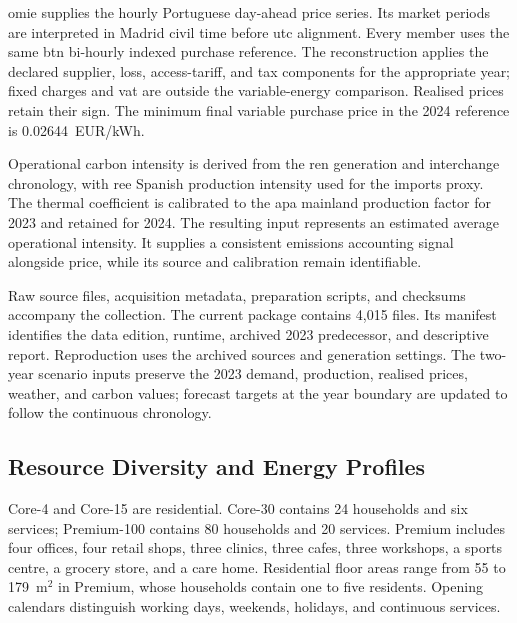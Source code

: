 \gls{omie} supplies the hourly Portuguese day-ahead price series. Its market periods are interpreted in Madrid civil time before \gls{utc} alignment. Every member uses the same \gls{btn} bi-hourly indexed purchase reference. The reconstruction applies the declared supplier, loss, access-tariff, and tax components for the appropriate year; fixed charges and \gls{vat} are outside the variable-energy comparison. Realised prices retain their sign. The minimum final variable purchase price in the 2024 reference is 0.02644~EUR/kWh.

Operational carbon intensity is derived from the \gls{ren} generation and interchange chronology, with \gls{ree} Spanish production intensity used for the imports proxy. The thermal coefficient is calibrated to the \gls{apa} mainland production factor for 2023 and retained for 2024. The resulting input represents an estimated average operational intensity. It supplies a consistent emissions accounting signal alongside price, while its source and calibration remain identifiable.

Raw source files, acquisition metadata, preparation scripts, and checksums accompany the collection. The current package contains 4,015 files. Its manifest identifies the data edition, runtime, archived 2023 predecessor, and descriptive report. Reproduction uses the archived sources and generation settings. The two-year scenario inputs preserve the 2023 demand, production, realised prices, weather, and carbon values; forecast targets at the year boundary are updated to follow the continuous chronology.

\subsection{Resource Diversity and Energy Profiles}

Core-4 and Core-15 are residential. Core-30 contains 24 households and six services; Premium-100 contains 80 households and 20 services. Premium includes four offices, four retail shops, three clinics, three cafes, three workshops, a sports centre, a grocery store, and a care home. Residential floor areas range from 55 to 179~m$^2$ in Premium, whose households contain one to five residents. Opening calendars distinguish working days, weekends, holidays, and continuous services.

